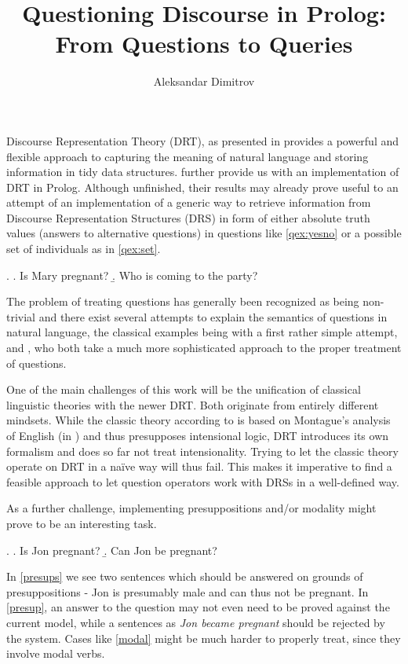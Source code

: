 \documentclass{article}
\author{Aleksandar Dimitrov}
\title{Questioning Discourse in Prolog: From Questions to Queries}
\begin{document}
\maketitle

Discourse Representation Theory (DRT), as presented in \citet{kampreyle:drt}
provides a powerful and flexible approach to capturing the meaning of natural
language and storing information in tidy data structures.
\citep{blackburnbos:cl2} further provide us with an implementation of DRT in
Prolog. Although unfinished, their results may already prove useful to an
attempt of an implementation of a generic way to retrieve information from
Discourse Representation Structures (DRS) in form of either absolute truth
values (answers to alternative questions) in questions like \ref{qex:yesno} or a
possible set of individuals as in \ref{qex:set}.

\ex. 
\a. Is Mary pregnant? \label{qex:yesno}
\b. Who is coming to the party? \label{qex:set}

The problem of treating questions has generally been recognized as being
non-trivial and there exist several attempts to explain the semantics of
questions in natural language, the classical examples being \citet{hamblin:1973}
with a first rather simple attempt, \citet{karttunen:1973} and \citet{gs:1984a},
who both take a much more sophisticated approach to the proper treatment of
questions.

One of the main challenges of this work will be the unification of classical
linguistic theories with the newer DRT. Both originate from entirely different
mindsets. While the classic theory according to \citep{karttunen:1973} is based
on Montague's analysis of English (in \citet{ptq}) and thus presupposes
intensional logic, DRT introduces its own formalism and does so far not treat
intensionality. Trying to let the classic theory operate on DRT in a naïve way
will thus fail. This makes it imperative to find a feasible approach to let
question operators work with DRSs in a well-defined way.

As a further challenge, implementing presuppositions and/or modality might prove
to be an interesting task. 

\ex. \label{presups}
\a. Is Jon pregnant? \label{presup}
\b. Can Jon be pregnant? \label{modal}

In \ref{presups} we see two sentences which should be answered on grounds of
presuppositions - Jon is presumably male and can thus not be pregnant. In
\ref{presup}, an answer to the question may not even need to be proved against
the current model, while a sentences as \emph{Jon became pregnant} should be
rejected by the system. Cases like \ref{modal} might be much harder to properly
treat, since they involve modal verbs.
\end{document}

